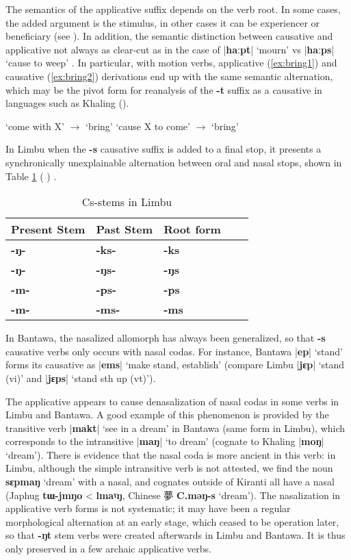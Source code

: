 \documentclass[oldfontcommands,oneside,a4paper,11pt]{article}
\newcommand{\ipa}[1]{\textbf{{\phon\mbox{#1}}}} %
\newcommand{\zh}[1]{{\cn #1}}
\newcommand{\dhatu}[2]{|\ipa{#1}| `#2'}
\begin{document}
The semantics of the applicative suffix depends on the verb root. In some cases, the added argument is the stimulus, in other cases it can be experiencer or beneficiary (see \citealt{jacques15derivational.khaling}). In addition, the semantic distinction between causative and applicative not always as clear-cut as in the case of \dhatu{haːpt}{mourn} vs \dhatu{haːps}{cause to weep} . In particular, with motion verbs, applicative (\ref{ex:bring1}) and causative (\ref{ex:bring2}) derivations end up with the same semantic alternation, which may be the pivot form for reanalysis of the \ipa{-t} suffix as a causative in languages such as Khaling (\citealt{jacques15derivational.khaling}).
\begin{exe}
\ex \label{ex:bring1}
\glt `come with X' $\rightarrow$ `bring'
\ex \label{ex:bring2}
\glt `cause X to come' $\rightarrow$ `bring'
\end{exe}
 
In Limbu when the \ipa{-s} causative suffix is added to a final stop, it presents a synchronically unexplainable alternation between oral and nasal stops, shown in Table \ref{tab:Cs.limbu} (\citealt{driem87} \citealt[xiii]{michailovsky02dico}) .

\begin{table}[H]
\caption{Cs-stems in Limbu} \centering \label{tab:Cs.limbu}
\begin{tabular}{lllll}
\toprule
Present Stem & Past Stem & Root form \\
\midrule
\ipa{-ŋ-} & \ipa{-ks-} & \ipa{-ks} \\
\ipa{-ŋ-} & \ipa{-ŋs-} & \ipa{-ŋs} \\
\ipa{-m-} & \ipa{-ps-} & \ipa{-ps} \\
\ipa{-m-} & \ipa{-ms-} & \ipa{-ms} \\
\bottomrule
\end{tabular}
\end{table} 

In Bantawa, the nasalized allomorph has always been generalized, so that \ipa{-s} causative verbs only occurs with nasal codas. For instance, Bantawa \dhatu{ep}{stand} forms its causative as \dhatu{ems}{make stand, establish} (compare Limbu \dhatu{jɛp}{stand (vi)}  and \dhatu{jɛps}{stand sth up (vt)}).

The applicative appears to cause denasalization of nasal codas in some verbs in Limbu and Bantawa. A good example of this phenomenon is provided by the transitive verb \dhatu{makt}{see in a dream}	in Bantawa (same form in Limbu), which corresponds to the intransitive \dhatu{maŋ}{to dream} (cognate to Khaling \dhatu{moŋ}{dream}). There is evidence that the nasal coda is more ancient in this verb: in Limbu, although the simple intransitive verb is not attested, we find the noun \ipa{sɛpmaŋ} `dream' with a nasal, and cognates outside of Kiranti all have a nasal (Japhug \ipa{tɯ-jmŋo} < \ipa{lmaˠŋ}, Chinese \zh{夢} \ipa{C.məŋ-s} `dream'). The nasalization in applicative verb forms is not systematic; it may have been a regular morphological alternation at an early stage, which ceased to be operation later, so that \ipa{-ŋt} stem verbs were created afterwards in Limbu and Bantawa. It is thus only preserved in a few archaic applicative verbs.
\end{document}
